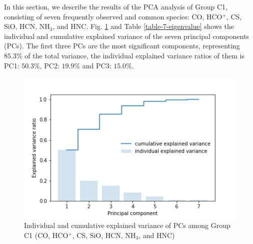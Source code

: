 \documentclass{aa}
\begin{document}
\begin{CJK*}{UTF8}{gbsn}
  In this section, we describe the results of the PCA analysis of Group C1, consisting of seven frequently observed and common species: CO, HCO$^+$, CS, SiO, HCN, NH$_3$, and HNC. 
  Fig. \ref{Fig-cloud-7-variance} and Table \ref{table-7-eigenvalue} shows the individual and cumulative explained variance of the seven principal components (PCs). The first three PCs are the most significant components, representing $85.3\%$ of the total variance, the individual explained variance ratios of them is PC1: $50.3\%$, PC2: $19.9\%$ and PC3: $15.0\%$.
  
  \begin{figure}[htbp]
   \centering
   \captionsetup{justification=centering}
   \includegraphics[angle=0,scale = 0.6]{7/explained_variance_ratio.png}
   \caption{Individual and cumulative explained variance of PCs among Group C1 (CO, HCO$^+$, CS, SiO, HCN, NH$_3$, and HNC)}
         \label{Fig-cloud-7-variance}
   \end{figure}
   



\end{CJK*}
\end{document}
